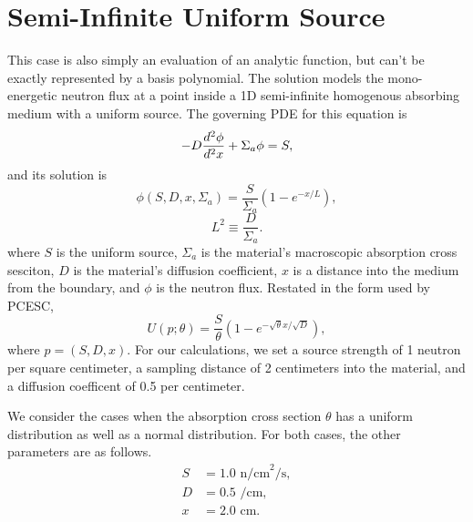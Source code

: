 \section{Semi-Infinite Uniform Source}
This case is also simply an evaluation of an analytic function, but can't be exactly represented by a basis polynomial.  The solution models the mono-energetic neutron flux at a point inside a 1D semi-infinite homogenous absorbing medium with a uniform source.  The governing PDE for this equation is
\begin{equation}
-D\frac{d^2 \phi}{d^2 x}+\Sigma_a\phi = S,
\end{equation}
and its solution is
\begin{equation}
\phi(S,D,x,\Sigma_a)=\frac{S}{\Sigma_a}\left(1-e^{-x/L}\right),
\end{equation}
\begin{equation}
L^2\equiv \frac{D}{\Sigma_a}.
\end{equation}
where $S$ is the uniform source, $\Sigma_a$ is the material's macroscopic absorption cross sesciton, $D$ is the material's diffusion coefficient, $x$ is a distance into the medium from the boundary, and $\phi$ is the neutron flux.  Restated in the form used by PCESC,
\begin{equation}
U(p;\theta) = \frac{S}{\theta}\left(1-e^{-\sqrt{\theta} x/\sqrt{D}}\right),
\end{equation}
where $p=(S,D,x)$.  For our calculations, we set a source strength of 1 neutron per square centimeter, a sampling distance of 2 centimeters into the material, and a diffusion coefficent of 0.5 per centimeter.

We consider the cases when the absorption cross section $\theta$ has a uniform distribution as well as a normal distribution.   For both cases, the other parameters are as follows.
\begin{align}
S &= 1.0 \text{ n/cm}^2\text{/s},\\
D &= 0.5 \text{ /cm},\\
x &= 2.0 \text{ cm}.
\end{align}

